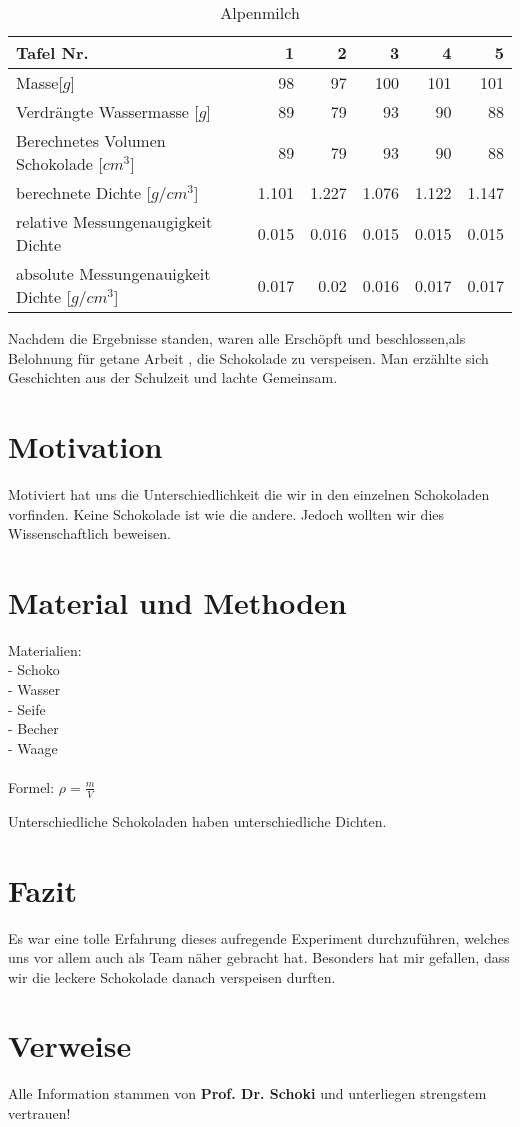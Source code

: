 \documentclass[12pt]{scrartcl}
\begin{document}
\begin{table}[h!]
	  \center
	  \caption{Alpenmilch}
      \label{tab:alpenmilch}	  
      \begin{tabular}{l|r|r|r|r|r}
      \toprule
      Tafel Nr. & 1 & 2 & 3 & 4 & 5\\
	  \midrule
      Masse[$g$] & 98 & 97 & 100 & 101 & 101\\
      \midrule
      Verdrängte Wassermasse [$g$] & 89 & 79 & 93 & 90 & 88\\
      \midrule
      Berechnetes Volumen Schokolade [$cm^3$] & 89 & 79 & 93 & 90 & 88\\
      \midrule
      berechnete Dichte [$g/cm^3$] & 1.101 & 1.227 & 1.076 & 1.122 & 1.147 \\
      \midrule
      relative Messungenaugigkeit Dichte & 0.015 & 0.016 & 0.015 & 0.015 & 0.015 \\
      \midrule
      absolute Messungenauigkeit Dichte [$g/cm^3$] & 0.017 & 0.02 & 0.016 & 0.017 & 0.017 \\
      \bottomrule
      \end{tabular}
	\end{table}
Nachdem die Ergebnisse standen, waren alle Erschöpft und beschlossen,als Belohnung für getane Arbeit , die Schokolade zu verspeisen. Man erzählte sich Geschichten aus der Schulzeit und lachte Gemeinsam.
\section{Motivation}
Motiviert hat uns die Unterschiedlichkeit die wir in den einzelnen Schokoladen vorfinden. Keine Schokolade ist wie die andere. Jedoch wollten wir dies Wissenschaftlich beweisen.
\section{Material und Methoden}
Materialien: \\
- Schoko \\
- Wasser \\
- Seife \\
- Becher \\
- Waage \\ \\
Formel: $\rho = \frac{m}{V}$
\pagebreak

Unterschiedliche Schokoladen haben unterschiedliche Dichten.
\section{Fazit}
Es war eine tolle Erfahrung dieses aufregende Experiment durchzuführen, welches uns vor allem auch als Team näher gebracht hat. Besonders hat mir gefallen, dass wir die leckere Schokolade danach verspeisen durften.
\section{Verweise}
Alle Information stammen von \textbf{Prof. Dr. Schoki} und unterliegen strengstem vertrauen! 
\end{document}
